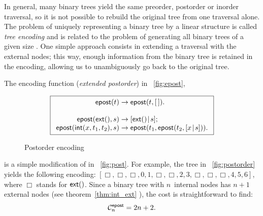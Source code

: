 In general, many binary trees yield the same preorder, postorder or
inorder traversal, so it is not possible to rebuild the original tree
from one traversal alone. The problem of uniquely representing a
binary tree by a linear structure is called \emph{tree encoding}
\citep{Makinen_1991} and is related to the problem of generating all
binary trees of a given size \citep[7.2.1.6]{Knuth_2011}. One simple
approach consists in extending a traversal with the external nodes;
this way, enough information from the binary tree is retained in the
encoding, allowing us to unambiguously go back to the original tree.

The encoding function
(\emph{extended postorder}) in
\fig~\vref{fig:epost},
\begin{figure}
\begin{equation*}
\boxed{
\begin{array}{r@{\;}c@{\;}l}
\fun{epost}(t) & \rightarrow & \fun{epost}(t,\el).\\
\\
\fun{epost}(\fun{ext}(),s) & \rightarrow
  & \cons{\fun{ext}()}{s};\\
\fun{epost}(\fun{int}(x,t_1,t_2),s) & \rightarrow
  & \fun{epost}(t_1,\fun{epost}(t_2,\cons{x}{s})).
\end{array}}
\end{equation*}
\caption{Postorder encoding}
\label{fig:epost}
\end{figure}
is a simple modification of  in
\fig~\vref{fig:post}. For example, the tree in
\fig~\vref{fig:postorder} yields the following encoding: \([\Box,
  \Box, \Box, 0, 1, \Box, \Box, 2, 3, \Box, \Box, \Box, 4, 5, 6]\),
where \(\Box\) stands for \(\textsf{ext}()\). Since a binary tree with
\(n\)~internal nodes has \(n+1\) external nodes (see
theorem~\ref{thm:int_ext} ), the cost is
straightforward to find:
\begin{equation*}
  \C{\fun{epost}}{n} = 2n + 2.
  \index{epost@$\C{\fun{epost}}{n}$}
\end{equation*}

